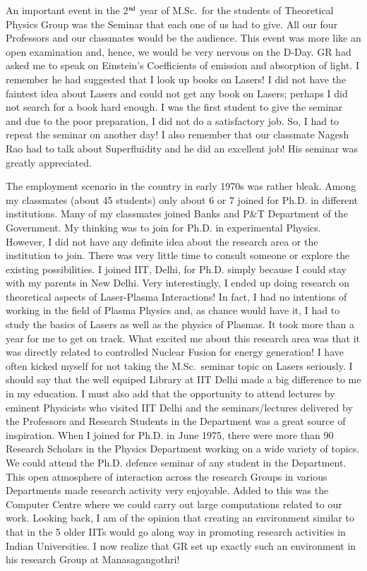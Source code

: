 An important event in the 2$^{\rm nd}$ year of M.Sc.\ for the students of Theoretical Physics Group was the Seminar that each one of us had to give. All our four Professors and our classmates would be the audience. This event was more like an open examination and, hence, we would be very nervous on the D-Day. GR had asked me to speak on Einstein's Coefficients of emission and absorption of light. I remember he had suggested that I look up books on Lasers! I did not have the faintest idea about Lasers and could not get any book on Lasers; perhaps I did not search for a book hard enough. I was the first student to give the seminar and due to the poor preparation, I did not do a satisfactory job. So, I had to repeat the seminar on another day! I also remember that our classmate Nagesh Rao had to talk about Superfluidity and he did an excellent job! His seminar was greatly appreciated.

The employment scenario in the country in early 1970s was rather bleak. Among my classmates (about 45 students) only about 6 or 7 joined for Ph.D. in different institutions. Many of my classmates joined Banks and P\&T Department of the Government. My thinking was to join for Ph.D. in experimental Physics. However, I did not have any definite idea about the research area or the institution to join. There was very little time to consult someone or explore the existing possibilities. I joined IIT, Delhi, for Ph.D. simply because I could stay with my parents in New Delhi. Very interestingly, I ended up doing research on theoretical aspects of Laser-Plasma Interactions! In fact, I had no intentions of working in the field of Plasma Physics and, as chance would have it, I had to study the basics of Lasers as well as the physics of Plasmas. It took more than a year for me to get on track. What excited me about this research area was that it was directly related to controlled Nuclear Fusion for energy generation! I have often kicked myself for not taking the M.Sc.\ seminar topic on Lasers seriously. I should say that the well equiped Library at IIT Delhi made a big difference to me in my education. I must also add that the opportunity to attend lectures by eminent Physicists who visited IIT Delhi and the seminars/lectures delivered by the Professors and Research Students in the Department was a great source of inspiration. When I joined for Ph.D. in June 1975, there were more than 90 Research Scholars in the Physics Department working on a wide variety of topics. We could attend the Ph.D. defence seminar of any student in the Department. This open atmosphere of interaction across the research Groups in various Departments made research activity very enjoyable. Added to this was the Computer Centre where we could carry out large computations related to our work. Looking back, I am of the opinion that creating an environment similar to that in the 5 older IITs would go along way in promoting research activities in Indian Universities. I now realize that GR set up exactly such an environment in his research Group at Manasagangothri!


